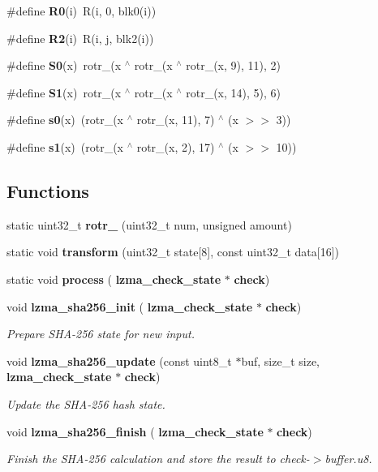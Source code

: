 \begin{DoxyCompactItemize}
\item 
\mbox{\label{sha256_8c_a7e9a53a90caf3f2f7748239643054c0a}} 
\#define {\bfseries R0}(i)~R(i, 0, blk0(i))
\item 
\mbox{\label{sha256_8c_a8b464a331c111c6767cdc3c1af6c306b}} 
\#define {\bfseries R2}(i)~R(i, j, blk2(i))
\item 
\mbox{\label{sha256_8c_a4fe3c738087e923a3174ad2a116e3be5}} 
\#define {\bfseries S0}(x)~rotr\+\_(x $^\wedge$ rotr\+\_(x $^\wedge$ rotr\+\_(x, 9), 11), 2)
\item 
\mbox{\label{sha256_8c_a59c41bcd16cbf3247d426429c3bf8e08}} 
\#define {\bfseries S1}(x)~rotr\+\_(x $^\wedge$ rotr\+\_(x $^\wedge$ rotr\+\_(x, 14), 5), 6)
\item 
\mbox{\label{sha256_8c_aa4074fe219868f65efa393f656020fed}} 
\#define {\bfseries s0}(x)~(rotr\+\_(x $^\wedge$ rotr\+\_(x, 11), 7) $^\wedge$ (x $>$$>$ 3))
\item 
\mbox{\label{sha256_8c_ac1e4ed4e56436a432900cad5a1225731}} 
\#define {\bfseries s1}(x)~(rotr\+\_(x $^\wedge$ rotr\+\_(x, 2), 17) $^\wedge$ (x $>$$>$ 10))
\end{DoxyCompactItemize}
\subsection*{Functions}
\begin{DoxyCompactItemize}
\item 
\mbox{\label{sha256_8c_a3d7c36c0c8994b20316859ddf2cd5b7b}} 
static uint32\+\_\+t {\bfseries rotr\+\_} (uint32\+\_\+t num, unsigned amount)
\item 
\mbox{\label{sha256_8c_a14d774b070bce574a526fd138ae70dea}} 
static void {\bfseries transform} (uint32\+\_\+t state[8], const uint32\+\_\+t data[16])
\item 
\mbox{\label{sha256_8c_a1a3c107d249ff7adedee1b0d94557500}} 
static void {\bfseries process} (\textbf{ lzma\+\_\+check\+\_\+state} $\ast$\textbf{ check})
\item 
void \textbf{ lzma\+\_\+sha256\+\_\+init} (\textbf{ lzma\+\_\+check\+\_\+state} $\ast$\textbf{ check})
\begin{DoxyCompactList}\small\item\em Prepare S\+H\+A-\/256 state for new input. \end{DoxyCompactList}\item 
void \textbf{ lzma\+\_\+sha256\+\_\+update} (const uint8\+\_\+t $\ast$buf, size\+\_\+t size, \textbf{ lzma\+\_\+check\+\_\+state} $\ast$\textbf{ check})
\begin{DoxyCompactList}\small\item\em Update the S\+H\+A-\/256 hash state. \end{DoxyCompactList}\item 
void \textbf{ lzma\+\_\+sha256\+\_\+finish} (\textbf{ lzma\+\_\+check\+\_\+state} $\ast$\textbf{ check})
\begin{DoxyCompactList}\small\item\em Finish the S\+H\+A-\/256 calculation and store the result to check-\/$>$buffer.\+u8. \end{DoxyCompactList}\end{DoxyCompactItemize}
